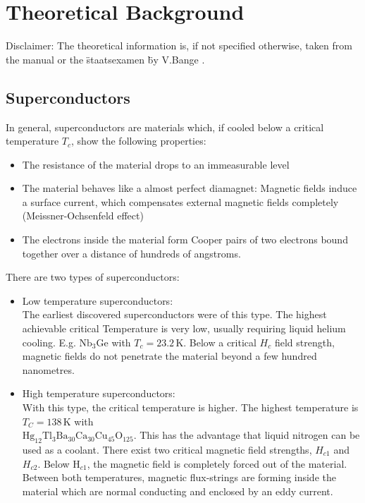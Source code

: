 \section{Theoretical Background}
Disclaimer: The theoretical information is, if not specified otherwise, taken from the manual \cite{anleitung}  or the \" staatsexamen \" by V.Bange \cite{staatsex_squid}.
\subsection{Superconductors}
In general, superconductors are materials which, if cooled below a critical temperature $T_c$, show the following properties:
\begin{itemize}

	\item The resistance of the material drops to an immeasurable level
	\item The material behaves like a almost perfect diamagnet: Magnetic fields induce a surface current, which compensates external magnetic fields completely (Meissner-Ochsenfeld effect)
	\item The electrons inside the material form Cooper pairs of two electrons bound together over a distance of hundreds of angstroms.
	
\end{itemize}
There are two types of superconductors: 
\begin{itemize}
	\item Low temperature superconductors:\\
	 The earliest discovered  superconductors were of this type. The highest achievable critical Temperature is very low, usually requiring liquid helium cooling. E.g. $\text{Nb}_3\text{Ge}$ with $T_c=23.2\,$K.
	Below a critical $H_c$ field strength, magnetic fields do not penetrate the material beyond a
	few hundred nanometres.
	\item High temperature superconductors: \\
	With this type, the critical temperature is higher. The highest temperature is   $T_C=138\,$K with\\
	$\text{Hg}_{12}\text{Tl}_{3}\text{Ba}_{30}\text{Ca}_{30}\text{Cu}_{45}\text{O}_{125}$.
	 This has the advantage that liquid nitrogen can be used as a coolant.
	There exist two critical magnetic field strengths, $H_{c1}$ and $H_{c2}$. Below $\text{H}_{c1}$, the magnetic field is completely forced out of the material. Between both temperatures, magnetic flux-strings are forming inside the material which are normal conducting and enclosed by an eddy current.
\end{itemize}
